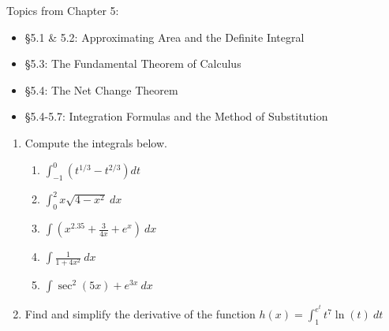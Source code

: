 \documentclass[11pt,fleqn]{article}
\def\ds{\displaystyle}
\begin{document}
\vspace*{-0.7in}

\begin{center}
  \Large{}
  \end{center}
  

Topics from Chapter 5: 
	\begin{itemize}
	\item \S 5.1 \& 5.2: Approximating Area and the Definite Integral
	\item \S 5.3: The Fundamental Theorem of Calculus
	\item \S 5.4: The Net Change Theorem
	\item \S 5.4-5.7: Integration Formulas and the Method of Substitution
	\end{itemize} 
\begin{enumerate}	


\item Compute the integrals below.
	\begin{enumerate}
	\item $\ds \int_{-1}^0 (t^{1/3} -t^{2/3}) dt$
	\vfill
	\item $\ds \int_0^2 x \sqrt{4-x^2} \: dx$
	\vfill\item $\ds \int (x^{2.35}+\frac{3}{4x}+e^x) \: dx$
	\vfill
	\item $\ds \int \frac{1}{1+4x^2} \: dx$
	\vfill
	\item $\ds \int \sec^2(5x)+e^{3x} \: dx$
	\vfill
	\end{enumerate}
\vfill
\newpage
\item Find and simplify the derivative of the function $\ds{h(x)=\int_1^{e^t} t^7\ln(t) \: dt}$\\
\vfill


\end{enumerate}
\end{document}
